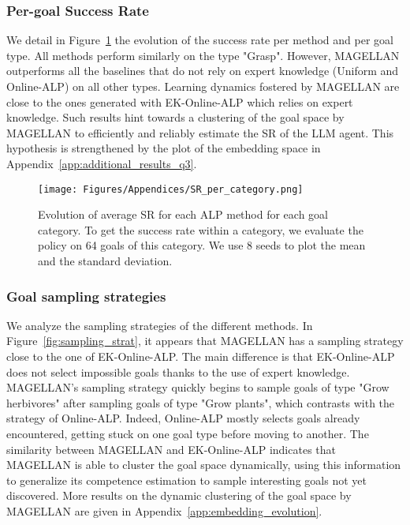 \subsubsection{Per-goal Success Rate}
\label{app:additional_results_q2_per_goal_success_rate}
We detail in Figure~\ref{fig:SR_per_category} the evolution of the success rate per method and per goal type. All methods perform similarly on the type "Grasp". However, MAGELLAN outperforms all the baselines that do not rely on expert knowledge (Uniform and Online-ALP) on all other types. Learning dynamics fostered by MAGELLAN are close to the ones generated with EK-Online-ALP which relies on expert knowledge. Such results hint towards a clustering of the goal space by MAGELLAN to efficiently and reliably estimate the SR of the LLM agent. This hypothesis is strengthened by the plot of the embedding space in Appendix~\ref{app:additional_results_q3}.

\begin{figure}[H]
    \centering
    \texttt{[image: Figures/Appendices/SR\_per\_category.png]}
    \caption{ Evolution of average SR for each ALP method for each goal category. To get the success rate within a category, we evaluate the policy on 64 goals of this category. We use 8 seeds to plot the mean and the standard deviation.}
    \label{fig:SR_per_category}
\end{figure}


\newpage
\subsubsection{Goal sampling strategies}
\label{app:additional_results_q2_goal_sampling_strategies}

We analyze the sampling strategies of the different methods. In Figure~\ref{fig:sampling_strat}, it appears that MAGELLAN has a sampling strategy close to the one of EK-Online-ALP. The main difference is that EK-Online-ALP does not select impossible goals thanks to the use of expert knowledge. MAGELLAN's sampling strategy quickly begins to sample goals of type "Grow herbivores" after sampling goals of type "Grow plants", which contrasts with the strategy of Online-ALP. Indeed, Online-ALP mostly selects goals already encountered, getting stuck on one goal type before moving to another. The  similarity between MAGELLAN and EK-Online-ALP indicates that MAGELLAN is able to cluster the goal space dynamically, using this information to generalize its competence estimation to sample interesting goals not yet discovered. More results on the dynamic clustering of the goal space by MAGELLAN are given in Appendix~\ref{app:embedding_evolution}. 

